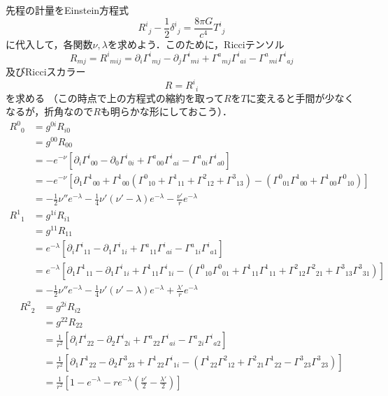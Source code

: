\documentclass[a4paper]{ltjsreport}
\begin{document}
先程の計量をEinstein方程式
\[ {R^i}_j - \frac{1}{2}{\delta^i}_j=\frac{8\pi{}G}{c^4}{T^i}_j \]
に代入して，各関数$\nu, \lambda$を求めよう．このために，Ricciテンソル
\[R_{mj}={R^i}_{mij}=\partial_i{\Gamma^i}_{mj} - \partial_j{\Gamma^i}_{mi} + {\Gamma^a}_{mj}{\Gamma^i}_{ai} - {\Gamma^a}_{mi}{\Gamma^i}_{aj}\]
及びRicciスカラー
\[R={R^i}_{i}\]
を求める
（この時点で上の方程式の縮約を取って$R$を$T$に変えると手間が少なくなるが，折角なので$R$も明らかな形にしておこう）．
\begin{align*}
  {R^0}_0 &= g^{0i}R_{i0}\\
  &= g^{00}R_{00}\\
  &= -  e^{ - \nu}\left[\partial_i{\Gamma^i}_{00} - \partial_0{\Gamma^i}_{0i} + {\Gamma^a}_{00}{\Gamma^i}_{ai} - {\Gamma^a}_{0i}{\Gamma^i}_{a0}\right]\\
  &= -  e^{ - \nu}\left[\partial_1{\Gamma^1}_{00} + {\Gamma^1}_{00}\left({\Gamma^0}_{10} + {\Gamma^1}_{11} + {\Gamma^2}_{12} + {\Gamma^3}_{13}\right) - \left({\Gamma^0}_{01}{\Gamma^1}_{00} + {\Gamma^1}_{00}{\Gamma^0}_{10}\right)\right]\\
  &= -  \frac{1}{2}\nu''e^{ - \lambda} - \frac{1}{4}\nu'(\nu' - \lambda)e^{ - \lambda} - \frac{\nu'}{r}e^{ - \lambda}
\end{align*}
\begin{align*}
  {R^1}_1 &= g^{1i}R_{i1}\\
  &= g^{11}R_{11}\\
  &= e^{ - \lambda}\left[\partial_i{\Gamma^i}_{11} - \partial_1{\Gamma^i}_{1i} + {\Gamma^a}_{11}{\Gamma^i}_{ai} - {\Gamma^a}_{1i}{\Gamma^i}_{a1}\right]\\
  &= e^{ - \lambda}\left[\partial_1{\Gamma^1}_{11} - \partial_1{\Gamma^i}_{1i} + {\Gamma^1}_{11}{\Gamma^i}_{1i} - \left({\Gamma^0}_{10}{\Gamma^0}_{01} + {\Gamma^1}_{11}{\Gamma^1}_{11} + {\Gamma^2}_{12}{\Gamma^2}_{21} + {\Gamma^3}_{13}{\Gamma^3}_{31}\right)\right]\\
  &= -  \frac{1}{2}\nu''e^{ - \lambda} - \frac{1}{4}\nu'(\nu' - \lambda)e^{ - \lambda} + \frac{\lambda'}{r}e^{ - \lambda}
\end{align*}
\begin{align*}
  {R^2}_2 &= g^{2i}R_{i2}\\
  &= g^{22}R_{22}\\
  &= \frac{1}{r^2}\left[\partial_i{\Gamma^i}_{22} - \partial_2{\Gamma^i}_{2i} + {\Gamma^a}_{22}{\Gamma^i}_{ai} - {\Gamma^a}_{2i}{\Gamma^i}_{a2}\right]\\
  &= \frac{1}{r^2}\left[\partial_1{\Gamma^1}_{22} - \partial_2{\Gamma^3}_{23} + {\Gamma^1}_{22}{\Gamma^i}_{1i} - \left({\Gamma^1}_{22}{\Gamma^2}_{12} + {\Gamma^2}_{21}{\Gamma^1}_{22} - {\Gamma^3}_{23}{\Gamma^3}_{23}\right)\right]\\
  &= \frac{1}{r^2}\left[1 - e^{ - \lambda} - re^{ - \lambda}\left(\frac{\nu'}{2} - \frac{\lambda'}{2}\right)\right]
\end{align*}
\end{document}
